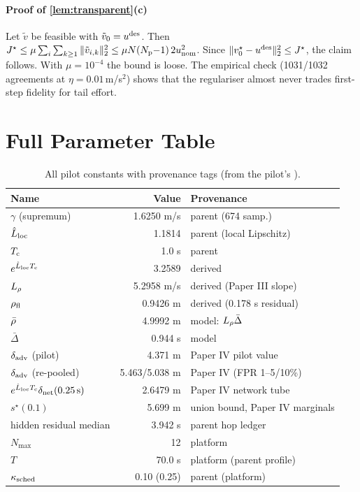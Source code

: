 \paragraph{Proof of \cref{lem:transparent}(c)} Let $\tilde v$ be feasible
with $\tilde v_0=u^{\mathrm{des}}$. Then
$J^\star\le\mu\sum_i\sum_{k\ge1}\|\tilde v_{i,k}\|_2^2\le\mu N(N_{\mathrm{p}}{-}1)\,2u_{\mathrm{nom}}^2$.
Since $\|v^\star_0-u^{\mathrm{des}}\|_2^2\le J^\star$, the claim follows. With
$\mu=10^{-4}$ the bound is loose. The empirical check (1031/1032 agreements
at $\eta=0.01$\,m/s$^2$) shows that the regulariser almost never trades
first-step fidelity for tail effort.

\section{Full Parameter Table}\label{app:params}
\begin{table}[h]
\centering\scriptsize
\caption{All pilot constants with provenance tags (from the pilot's
).}
\label{tab:paramsfull}
\setlength{\tabcolsep}{2pt}
\begin{tabular}{@{}lrl@{}}
\toprule
Name & Value & Provenance \\
\midrule
$\gamma$ (supremum) & 1.6250 m/s & parent (674 samp.)\\
$\hat L_{\mathrm{loc}}$ & 1.1814 & parent (local Lipschitz)\\
$T_{\mathrm{c}}$ & 1.0 s & parent\\
$e^{\hat L_{\mathrm{loc}}T_{\mathrm{c}}}$ & 3.2589 & derived\\
$L_{\rho}$ & 5.2958 m/s & derived (Paper III slope)\\
$\rho_{\mathrm{fl}}$ & 0.9426 m & derived (0.178 s residual)\\
$\bar\rho$ & 4.9992 m & model: $L_{\rho}\bar\Delta$\\
$\bar\Delta$ & 0.944 s & model\\
$\delta_{\mathrm{adv}}$ (pilot) & 4.371 m & Paper IV pilot value\\
$\delta_{\mathrm{adv}}$ (re-pooled) & 5.463/5.038 m & Paper IV (FPR 1--5/10\%)\\
$e^{\hat L_{\mathrm{loc}}T_{\mathrm{c}}}\delta_{\mathrm{net}}(0.25\,\mathrm s)$ & 2.6479 m & Paper IV network tube\\
$s^\star(0.1)$ & 5.699 m & union bound, Paper IV marginals\\
hidden residual median & 3.942 s & parent hop ledger\\
$N_{\max}$ & 12 & platform\\
$T$ & 70.0 s & platform (parent profile)\\
$\kappa_{\mathrm{sched}}$ & 0.10 (0.25) & parent (platform)\\

\end{tabular}
\end{table}
